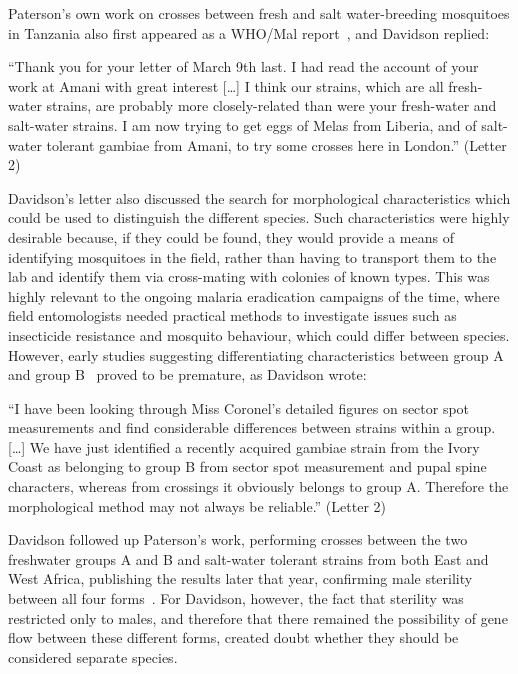 \documentclass[a4paper,11pt,abstracton,hidelinks]{scrartcl}
\begin{document}
Paterson's own work on crosses between fresh and salt water-breeding mosquitoes in Tanzania also first appeared as a WHO/Mal report~\parencite{Paterson1962a}, and Davidson replied:


\begin{displayquote}
``Thank you for your letter of March 9th last. I had read the account of your work at Amani with great interest [\ldots] I think our strains, which are all fresh-water strains, are probably more closely-related than were your fresh-water and salt-water strains. I am now trying to get eggs of Melas from Liberia, and of salt-water tolerant gambiae from Amani, to try some crosses here in London.'' (Letter 2)
\end{displayquote}


Davidson's letter also discussed the search for morphological characteristics which could be used to distinguish the different species.
%
Such characteristics were highly desirable because, if they could be found, they would provide a means of identifying mosquitoes in the field, rather than having to transport them to the lab and identify them via cross-mating with colonies of known types.
%
This was highly relevant to the ongoing malaria eradication campaigns of the time, where field entomologists needed practical methods to investigate issues such as insecticide resistance and mosquito behaviour, which could differ between species.
%
However, early studies suggesting differentiating characteristics between group A and group B~\parencite{Coronel1962} proved to be premature, as Davidson wrote:



\begin{displayquote}
``I have been looking through Miss Coronel's detailed figures on sector spot measurements and find considerable differences between strains within a group. [\ldots] We have just identified a recently acquired gambiae strain from the Ivory Coast as belonging to group B from sector spot measurement and pupal spine characters, whereas from crossings it obviously belongs to group A. Therefore the morphological method may not always be reliable.'' (Letter 2)
\end{displayquote}


Davidson followed up Paterson's work, performing crosses between the two freshwater groups A and B and salt-water tolerant strains from both East and West Africa, publishing the results later that year, confirming male sterility between all four forms~\parencite{Davidson1962b}.
%
For Davidson, however, the fact that sterility was restricted only to males, and therefore that there remained the possibility of gene flow between these different forms, created doubt whether they should be considered separate species.
\end{document}
